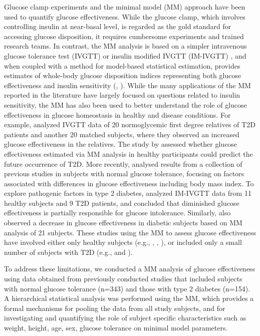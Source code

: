 \documentclass[utf8]{frontiersSCNS} %
\begin{document}
Glucose clamp experiments and the minimal model (MM) approach have been used to quantify glucose effectiveness. While the glucose clamp, which involves controlling insulin at near-basal level, is regarded as the gold standard for accessing glucose disposition, it requires cumbersome experiments and trained research teams. In contrast, the MM analysis is based on a simpler intravenous glucose tolerance test (IVGTT) or insulin modified IVGTT (IM-IVGTT) , and when coupled with a method for model-based statistical estimation, provides estimates of whole-body glucose disposition indices representing both glucose effectiveness and insulin sensitivity (\citet{bergman_equ}, \citet{jan_equ}). While the many applications of the MM reported in the literature have largely focused on questions related to insulin sensitivity, the MM has also been used to better understand the role of glucose effectiveness in glucose homeostasis in healthy and disease conditions. For example, \citet{jan_relative} analyzed IVGTT data of 20 normoglycemic first degree relatives of T2D patients and another 20 matched subjects, where they observed an increased glucose effectiveness in the relatives. The study by \cite{lorenzo_2010} assessed whether glucose effectiveness estimated via MM analysis in healthy participants could predict the future occurrence of T2D. More recently, \citet{SG_compo} analysed results from a collection of previous studies in subjects with normal glucose tolerance, focusing on factors associated with differences in glucose effectiveness including body mass index. To explore pathogenic factors in type 2 diabetes, \citet{ataru_1992} analyzed IM-IVGTT data from 11 healthy subjects and 9 T2D patients, and concluded that diminished glucose effectiveness is partially responsible for glucose intolerance. Similarly, \citet{welch_1990} also observed a decrease in glucose effectiveness in diabetic subjects based on MM analysis of 21 subjects. These studies using the MM to assess glucose effectiveness have involved either only healthy subjects (e.g., \citet{jan_relative}, \cite{lorenzo_2010}, \citet{SG_compo}), or included only a small number of subjects with T2D (e.g., \citet{ataru_1992} and \citet{welch_1990}).  

To address these limitations, we conducted a MM analysis of glucose effectiveness using data obtained from previously conducted studies that included subjects with normal glucose tolerance (n=343) and those with type 2 diabetes (n=154). A hierarchical statistical analysis was performed using the MM, which provides a formal mechanisms for pooling the data from all study subjects, and for investigating and quantifying the role of subject specific characteristics such as weight, height, age, sex, glucose tolerance on minimal model parameters.
\end{document}
